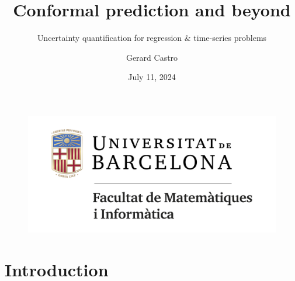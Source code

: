 \documentclass{beamer}
\title{Conformal prediction and beyond}
\subtitle{Uncertainty quantification for regression \& time-series problems}
\institute{%
Universitat de Barcelona}
\author{Gerard Castro}
\date{July 11, 2024} %
\begin{document}

\begin{frame}
    \titlepage
    \begin{figure}[htpb]
        \begin{center}
           \includegraphics[width=0.4\linewidth]{Figures/fmiub.png}
        \end{center}
    \end{figure}
\end{frame}




\section{Introduction}

\end{document}
